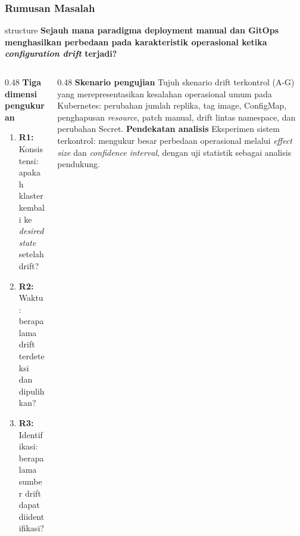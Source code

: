 {
\usebackgroundtemplate{\backgroundcontent}
\begin{frame}
    \frametitle{Rumusan Masalah}
    \vspace{0.04cm}
    \begin{beamercolorbox}[wd=\textwidth, sep=0.20cm, center, rounded=true]{structure}
        \small\bfseries
        Sejauh mana paradigma deployment manual dan GitOps menghasilkan perbedaan pada karakteristik operasional ketika \textit{configuration drift} terjadi?
    \end{beamercolorbox}
    \vspace{0.10cm}
    \begin{columns}[T]
        \begin{column}{0.48\textwidth}
            \small\textbf{Tiga dimensi pengukuran}
            \begin{enumerate}\setlength{\itemsep}{2pt}
                \item \textbf{R1:} Konsistensi: apakah klaster kembali ke \textit{desired state} setelah drift?
                \item \textbf{R2:} Waktu: berapa lama drift terdeteksi dan dipulihkan?
                \item \textbf{R3:} Identifikasi: berapa lama sumber drift dapat diidentifikasi?
            \end{enumerate}
        \end{column}
        \begin{column}{0.48\textwidth}
            \small\textbf{Skenario pengujian}
            \vspace{0.04cm}
            \scriptsize
            Tujuh skenario drift terkontrol (A-G) yang merepresentasikan kesalahan operasional umum pada Kubernetes: perubahan jumlah replika, tag image, ConfigMap, penghapusan \textit{resource}, patch manual, drift lintas namespace, dan perubahan Secret.
            \vspace{0.08cm}
            \small\textbf{Pendekatan analisis}
            \scriptsize
            Eksperimen sistem terkontrol: mengukur besar perbedaan operasional melalui \textit{effect size} dan \textit{confidence interval}, dengan uji statistik sebagai analisis pendukung.
        \end{column}
    \end{columns}
\end{frame}
}


